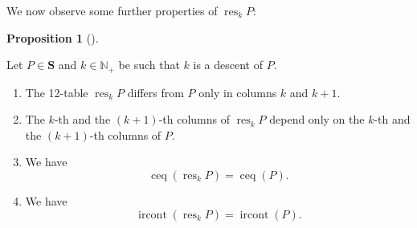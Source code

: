 \documentclass[numbers=enddot,12pt,final,onecolumn,notitlepage]{scrartcl}%
\theoremstyle{definition}
\newtheorem{prop}[theo]{Proposition}
\newenvironment{proposition}[1][]
{\begin{prop}[#1]\begin{leftbar}}
{\end{leftbar}\end{prop}}
\begin{document}
We now observe some further properties of $\operatorname*{res}\nolimits_{k}P$:

\begin{proposition}
\label{prop.descent-resolution-props}Let $P\in\mathbf{S}$ and $k\in
\mathbb{N}_{+}$ be such that $k$ is a descent of $P$.

\begin{enumerate}
\renewcommand{\theenumi}{\alph{enumi}}
\renewcommand{\labelenumi}{\textbf{(\theenumi)}}

\item \label{pf.lem.BK.res.loc}
The 12-table $\operatorname*{res}\nolimits_{k}P$ differs from $P$
only in columns $k$ and $k+1$.

\item \label{pf.lem.BK.res.loc2}
The $k$-th and the $\left(  k+1\right)  $-th columns of
$\operatorname*{res}\nolimits_{k}P$ depend only on the $k$-th and the $\left(
k+1\right)  $-th columns of $P$.

\item \label{pf.lem.BK.res.ceq}
We have%
\[
\operatorname*{ceq}\left(  \operatorname*{res}\nolimits_{k}P\right)
=\operatorname*{ceq}\left(  P\right) .
\]

\item \label{pf.lem.BK.res.irconts}
We have%
\[
\operatorname*{ircont}\left(  \operatorname*{res}\nolimits_{k}P\right)
=\operatorname*{ircont}\left(  P\right)  .
\]


\end{enumerate}
\end{proposition}
\end{document}
